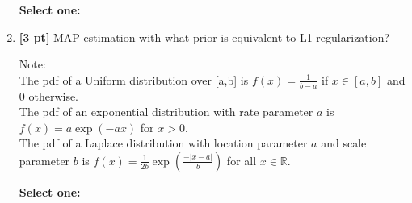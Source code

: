 \documentclass{article}
\renewcommand{\circle}{\tikz\draw[black] (0,0) circle (1ex);}
\begin{document}
\begin{enumerate}
    \textbf{Select one:}
    
    \clearpage
    
    \item \textbf{[3 pt]} MAP estimation with what prior is equivalent to L1 regularization? 

    Note:\\
    The pdf of a Uniform distribution over [a,b] is $f(x) = \frac{1}{b-a}$ if $x \in [a,b]$ and 0 otherwise.\\
    The pdf of an exponential distribution with rate parameter $a$ is $f(x) = a \exp(-a x)$ for $x > 0$.\\
    The pdf of a Laplace distribution with location parameter $a$ and scale parameter $b$  is $f(x) = \frac{1}{2b} \exp \left( \frac{- |x - a| }{b} \right)$ for all $x \in \mathbb{R}$.
    

    \textbf{Select one:}
    
\end{enumerate}

\clearpage
\end{document}
